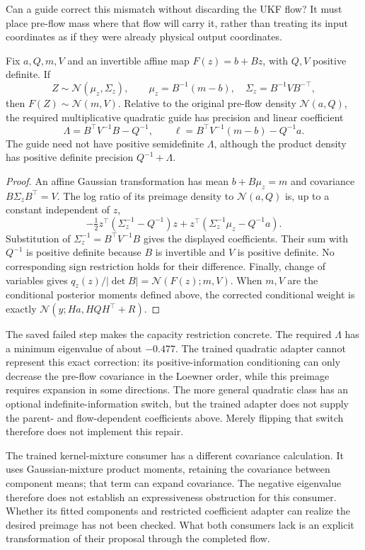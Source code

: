 Can a guide correct this mismatch without discarding the UKF flow? It must
place pre-flow mass where that flow will carry it, rather than treating its
input coordinates as if they were already physical output coordinates.
\begin{proposition}
\label{prop:sg-gaussian-preimage}
Fix $a,Q,m,V$ and an invertible affine map $F(z)=b+Bz$, with $Q,V$ positive
definite. If
\[
 Z\sim\mathcal N(\mu_z,\Sigma_z),\qquad
 \mu_z=B^{-1}(m-b),\quad \Sigma_z=B^{-1}VB^{-\top},
\]
then $F(Z)\sim\mathcal N(m,V)$. Relative to the original pre-flow density
$\mathcal N(a,Q)$, the required multiplicative quadratic guide has precision
and linear coefficient
\[
 \Lambda=B^\top V^{-1}B-Q^{-1},\qquad
 \ell=B^\top V^{-1}(m-b)-Q^{-1}a.
\]
The guide need not have positive semidefinite $\Lambda$, although the product
density has positive definite precision $Q^{-1}+\Lambda$.
\end{proposition}
\begin{proof}
An affine Gaussian transformation has mean $b+B\mu_z=m$ and covariance
$B\Sigma_z B^\top=V$. The log ratio of its preimage density to
$\mathcal N(a,Q)$ is, up to a constant independent of $z$,
\[
 -\tfrac12 z^\top(\Sigma_z^{-1}-Q^{-1})z
 +z^\top(\Sigma_z^{-1}\mu_z-Q^{-1}a).
\]
Substitution of $\Sigma_z^{-1}=B^\top V^{-1}B$ gives the displayed
coefficients. Their sum with $Q^{-1}$ is positive definite because $B$ is
invertible and $V$ is positive definite. No corresponding sign restriction
holds for their difference. Finally, change of variables gives
$q_z(z)/|\det B|=\mathcal N(F(z);m,V)$. When $m,V$ are the conditional
posterior moments defined above, the corrected conditional weight is exactly
$\mathcal N(y;Ha,HQH^\top+R)$.
\end{proof}

The saved failed step makes the capacity restriction concrete. The required
$\Lambda$ has a minimum eigenvalue of about $-0.477$. The trained quadratic
adapter cannot represent this exact correction: its positive-information
conditioning can only decrease the pre-flow covariance in the Loewner order,
while this preimage requires expansion in some directions. The more general
quadratic class has an optional indefinite-information switch, but the trained
adapter does not supply the parent- and flow-dependent coefficients above.
Merely flipping that switch therefore does not implement this repair.

The trained kernel-mixture consumer has a different covariance calculation.
It uses Gaussian-mixture product moments, retaining the covariance between
component means; that term can expand covariance. The negative eigenvalue
therefore does not establish an expressiveness obstruction for this consumer.
Whether its fitted components and restricted coefficient adapter can realize
the desired preimage has not been checked. What both consumers lack is an
explicit transformation of their proposal through the completed flow.

